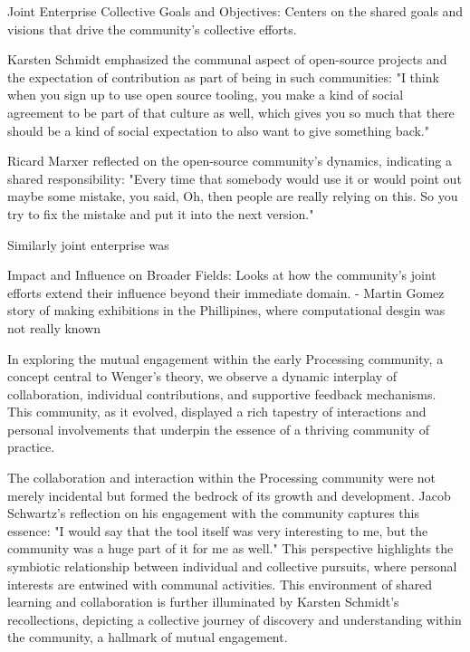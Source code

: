 Joint Enterprise
Collective Goals and Objectives: Centers on the shared goals and visions that drive the community's collective efforts.

Karsten Schmidt emphasized the communal aspect of open-source projects and the expectation of contribution as part of being in such communities: "I think when you sign up to use open source tooling, you make a kind of social agreement to be part of that culture as well, which gives you so much that there should be a kind of social expectation to also want to give something back."

Ricard Marxer reflected on the open-source community's dynamics, indicating a shared responsibility: "Every time that somebody would use it or would point out maybe some mistake, you said, Oh, then people are really relying on this. So you try to fix the mistake and put it into the next version."



Similarly joint enterprise was 

Impact and Influence on Broader Fields: Looks at how the community's joint efforts extend their influence beyond their immediate domain.
- Martin Gomez story of making exhibitions in the Phillipines, where computational desgin was not really known


In exploring the mutual engagement within the early Processing community, a concept central to Wenger's theory, we observe a dynamic interplay of collaboration, individual contributions, and supportive feedback mechanisms. This community, as it evolved, displayed a rich tapestry of interactions and personal involvements that underpin the essence of a thriving community of practice.

The collaboration and interaction within the Processing community were not merely incidental but formed the bedrock of its growth and development. Jacob Schwartz's reflection on his engagement with the community captures this essence: "I would say that the tool itself was very interesting to me, but the community was a huge part of it for me as well." This perspective highlights the symbiotic relationship between individual and collective pursuits, where personal interests are entwined with communal activities. This environment of shared learning and collaboration is further illuminated by Karsten Schmidt's recollections, depicting a collective journey of discovery and understanding within the community, a hallmark of mutual engagement.


